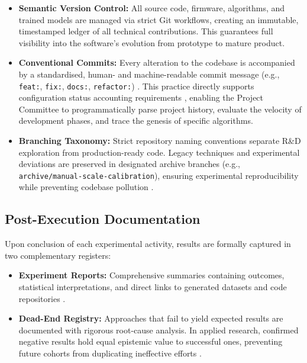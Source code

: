 \documentclass[11pt, a4paper]{article}
\begin{document}
\begin{itemize}

    \item \textbf{Semantic Version Control:} All source code, firmware, algorithms, and trained models are managed via strict Git workflows, creating an immutable, timestamped ledger of all technical contributions. This guarantees full visibility into the software's evolution from prototype to mature product.
    
    \item \textbf{Conventional Commits:} Every alteration to the codebase is accompanied by a standardised, human- and machine-readable commit message (e.g., \texttt{feat:}, \texttt{fix:}, \texttt{docs:}, \texttt{refactor:}) \cite{conventionalcommits}. This practice directly supports configuration status accounting requirements \cite[Sec. 6.3.5.3]{iso_iec_ieee_12207_2017}, enabling the Project Committee to programmatically parse project history, evaluate the velocity of development phases, and trace the genesis of specific algorithms.
    
    \item \textbf{Branching Taxonomy:} Strict repository naming conventions separate R\&D exploration from production-ready code. Legacy techniques and experimental deviations are preserved in designated archive branches (e.g., \texttt{archive/manual-scale-calibration}), ensuring experimental reproducibility while preventing codebase pollution \cite[Sec. 7.5.3 \& 8.5.2]{iso9001_2015}.
    
\end{itemize}


\subsection{Post-Execution Documentation}

Upon conclusion of each experimental activity, results are formally captured in two complementary registers:

\begin{itemize}
    
    \item \textbf{Experiment Reports:} Comprehensive summaries containing outcomes, statistical interpretations, and direct links to generated datasets and code repositories \cite[Sec. 7.5]{iso9001_2015} \cite{wilkinson2016fair}.
    
    \item \textbf{Dead-End Registry:} Approaches that fail to yield expected results are documented with rigorous root-cause analysis. In applied research, confirmed negative results hold equal epistemic value to successful ones, preventing future cohorts from duplicating ineffective efforts \cite[Sec. 7.18]{iso21502_2020} \cite{wingate2025project}.

\end{itemize}
\end{document}
